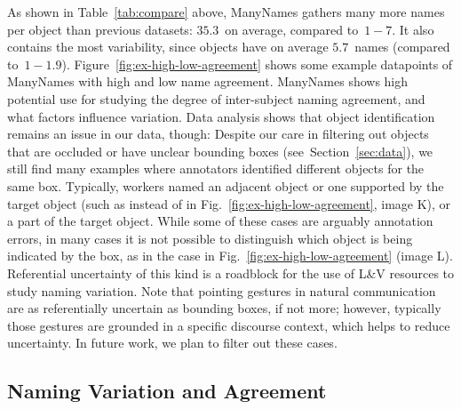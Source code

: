 As shown in Table~\ref{tab:compare} above, ManyNames gathers many more names per object than previous datasets: $35.3$~on average, compared to~$1-7$.
It also contains the most variability, since objects have on average $5.7$~names (compared to~\mbox{$1-1.9$}).
Figure~\ref{fig:ex-high-low-agreement} shows some example datapoints of ManyNames with high and low name agreement.
ManyNames 
shows high potential use for studying the degree of inter-subject naming agreement, and what factors influence variation.
Data analysis shows that object identification remains an issue in our data, though: Despite our care in filtering out objects that are occluded or have unclear bounding boxes (see\ Section~\ref{sec:data}), we still find many examples where annotators identified different objects for the same box. 
Typically, workers named an adjacent object or one supported by the target object (such as  instead of  in Fig.~\ref{fig:ex-high-low-agreement}, image K), or a part of the target object.
While some of these cases are arguably annotation errors, in many cases it is not possible to distinguish which object is being indicated by the  box, as in the  case in Fig.~\ref{fig:ex-high-low-agreement} (image L).
Referential uncertainty of this kind is a roadblock for the use of L\&V resources to study naming variation.
Note that pointing gestures in natural communication are as referentially uncertain as bounding boxes, if not more; however, typically those gestures are grounded in a specific discourse context, which helps to reduce uncertainty.
In future work, we plan to filter out these cases.

\subsection{Naming Variation and Agreement}
\label{subsec:counts}

